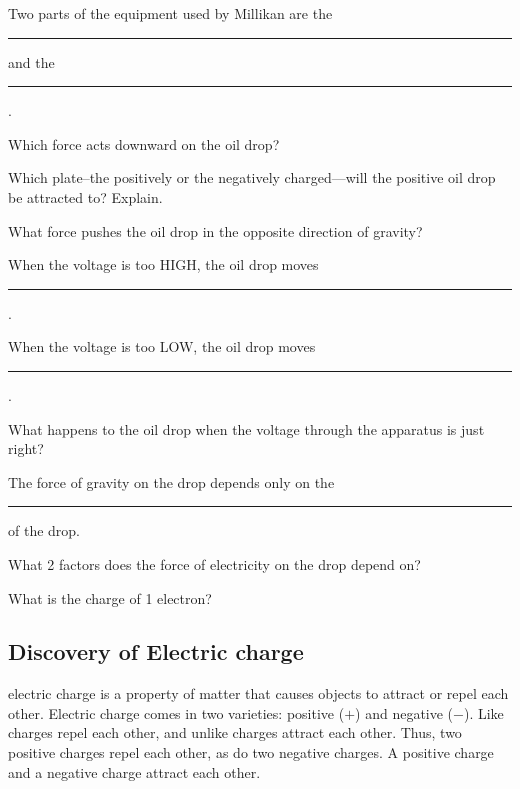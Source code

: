 \documentclass[main.tex]{subfiles}
\begin{document}
\begin{exercise}
    Two parts of the equipment used by Millikan are the \rule{2cm}{0.15mm} and the \rule{2cm}{0.15mm}.
\end{exercise}

\begin{exercise}
    Which force acts downward on the oil drop?
\end{exercise}

\begin{exercise}
    Which plate--the positively or the negatively charged---will the positive oil drop be attracted to? Explain.
\end{exercise}

\begin{exercise}
    What force pushes the oil drop in the opposite direction of gravity?
\end{exercise}

\begin{exercise}
    When the voltage is too HIGH, the oil drop moves \rule{2cm}{0.15mm}.
\end{exercise}

\begin{exercise}
    When the voltage is too LOW, the oil drop moves \rule{2cm}{0.15mm}.
\end{exercise}

\begin{exercise}
    What happens to the oil drop when the voltage through the apparatus is just right?
\end{exercise}

\begin{exercise}
    The force of gravity on the drop depends only on the \rule{2cm}{0.15mm} of the drop.
\end{exercise}

\begin{exercise}
    What 2 factors does the force of electricity on the drop depend on?
\end{exercise}

\begin{exercise} \label{Q68N4Y}
    What is the charge of 1 electron?
\end{exercise}

\subsection{Discovery of Electric charge} \label{DicxAf}
\Gls{electric charge} is a property of matter that causes objects to attract or repel each other. Electric charge comes in two varieties: positive ($+$) and negative ($-$). Like charges repel each other, and unlike charges attract each other. Thus, two positive charges repel each other, as do two negative charges. A positive charge and a negative charge attract each other.
\vspace{1em}
\end{document}
